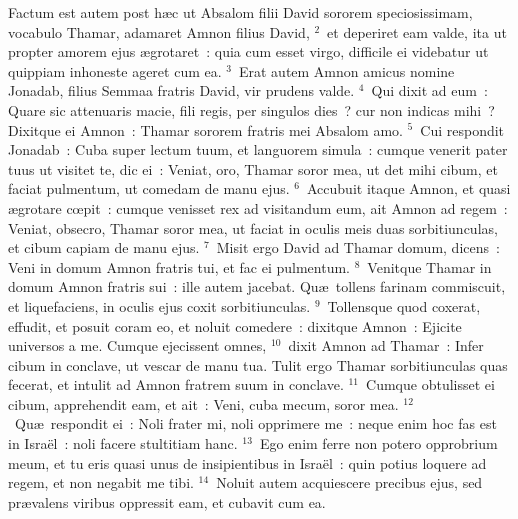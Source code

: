 \lettrine[lines=3,image=true,loversize=0.05,lraise=-0.03]{F}{}actum est autem post h\ae c ut Absalom filii David sororem speciosissimam, vocabulo Thamar, adamaret Amnon filius David,
${}^{2}$~et deperiret eam valde, ita ut propter amorem ejus \ae grotaret~: quia cum esset virgo, difficile ei videbatur ut quippiam inhoneste ageret cum ea.
${}^{3}$~Erat autem Amnon amicus nomine Jonadab, filius Semmaa fratris David, vir prudens valde.
${}^{4}$~Qui dixit ad eum~: Quare sic attenuaris macie, fili regis, per singulos dies~? cur non indicas mihi~? Dixitque ei Amnon~: Thamar sororem fratris mei Absalom amo.
${}^{5}$~Cui respondit Jonadab~: Cuba super lectum tuum, et languorem simula~: cumque venerit pater tuus ut visitet te, dic ei~: Veniat, oro, Thamar soror mea, ut det mihi cibum, et faciat pulmentum, ut comedam de manu ejus.
${}^{6}$~Accubuit itaque Amnon, et quasi \ae grotare cœpit~: cumque venisset rex ad visitandum eum, ait Amnon ad regem~: Veniat, obsecro, Thamar soror mea, ut faciat in oculis meis duas sorbitiunculas, et cibum capiam de manu ejus.
${}^{7}$~Misit ergo David ad Thamar domum, dicens~: Veni in domum Amnon fratris tui, et fac ei pulmentum.
${}^{8}$~Venitque Thamar in domum Amnon fratris sui~: ille autem jacebat. Qu\ae\ tollens farinam commiscuit, et liquefaciens, in oculis ejus coxit sorbitiunculas.
${}^{9}$~Tollensque quod coxerat, effudit, et posuit coram eo, et noluit comedere~: dixitque Amnon~: Ejicite universos a me. Cumque ejecissent omnes,
${}^{10}$~dixit Amnon ad Thamar~: Infer cibum in conclave, ut vescar de manu tua. Tulit ergo Thamar sorbitiunculas quas fecerat, et intulit ad Amnon fratrem suum in conclave.
${}^{11}$~Cumque obtulisset ei cibum, apprehendit eam, et ait~: Veni, cuba mecum, soror mea.
${}^{12}$~Qu\ae\ respondit ei~: Noli frater mi, noli opprimere me~: neque enim hoc fas est in Isra\"el~: noli facere stultitiam hanc.
${}^{13}$~Ego enim ferre non potero opprobrium meum, et tu eris quasi unus de insipientibus in Isra\"el~: quin potius loquere ad regem, et non negabit me tibi.
${}^{14}$~Noluit autem acquiescere precibus ejus, sed pr\ae valens viribus oppressit eam, et cubavit cum ea.


